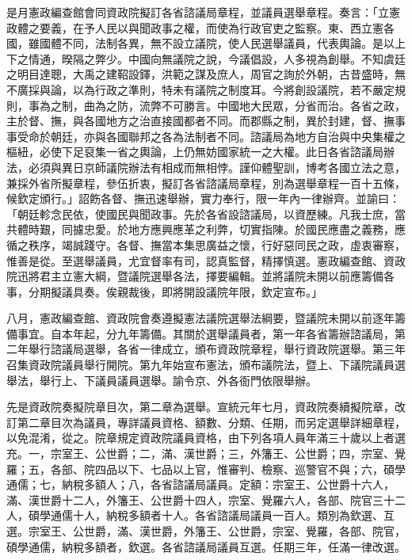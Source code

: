 \begin{pinyinscope}
是月憲政編查館會同資政院擬訂各省諮議局章程，並議員選舉章程。奏言：「立憲政體之要義，在予人民以與聞政事之權，而使為行政官吏之監察。東、西立憲各國，雖國體不同，法制各異，無不設立議院，使人民選舉議員，代表輿論。是以上下之情通，暌隔之弊少。中國向無議院之說，今議倡設，人多視為創舉。不知虞廷之明目達聰，大禹之建鞀設鐸，洪範之謀及庶人，周官之詢於外朝，古昔盛時，無不廣採與論，以為行政之準則，特未有議院之制度耳。今將創設議院，若不嚴定規則，事為之制，曲為之防，流弊不可勝言。中國地大民眾，分省而治。各省之政，主於督、撫，與各國地方之治直接國都者不同。而郡縣之制，異於封建，督、撫事事受命於朝廷，亦與各國聯邦之各為法制者不同。諮議局為地方自治與中央集權之樞紐，必使下足裒集一省之輿論，上仍無妨國家統一之大權。此日各省諮議局辦法，必須與異日京師議院辦法有相成而無相悖。謹仰體聖訓，博考各國立法之意，兼採外省所擬章程，參伍折衷，擬訂各省諮議局章程，別為選舉章程一百十五條，候欽定頒行。」詔飭各督、撫迅速舉辦，實力奉行，限一年內一律辦齊。並諭曰：「朝廷軫念民依，使國民與聞政事。先於各省設諮議局，以資歷練。凡我士庶，當共體時艱，同攄忠愛。於地方應興應革之利弊，切實指陳。於國民應盡之義務，應循之秩序，竭誠踐守。各督、撫當本集思廣益之懷，行好惡同民之政，虛衷審察，惟善是從。至選舉議員，尤宜督率有司，認真監督，精擇慎選。憲政編查館、資政院迅將君主立憲大綱，暨議院選舉各法，擇要編輯。並將議院未開以前應籌備各事，分期擬議具奏。俟親裁後，即將開設議院年限，欽定宣布。」

八月，憲政編查館、資政院會奏遵擬憲法議院選舉法綱要，暨議院未開以前逐年籌備事宜。自本年起，分九年籌備。其關於選舉議員者，第一年各省籌辦諮議局，第二年舉行諮議局選舉，各省一律成立，頒布資政院章程，舉行資政院選舉。第三年召集資政院議員舉行開院。第九年始宣布憲法，頒布議院法，暨上、下議院議員選舉法，舉行上、下議員議員選舉。諭令京、外各衙門依限舉辦。

先是資政院奏擬院章目次，第二章為選舉。宣統元年七月，資政院奏續擬院章，改訂第二章目次為議員，專詳議員資格、額數、分類、任期，而另定選舉詳細章程，以免混淆，從之。院章規定資政院議員資格，由下列各項人員年滿三十歲以上者選充。一，宗室王、公世爵；二，滿、漢世爵；三，外籓王、公世爵；四，宗室、覺羅；五，各部、院四品以下、七品以上官，惟審判、檢察、巡警官不與；六，碩學通儒；七，納稅多額人；八，各省諮議局議員。定額：宗室王、公世爵十六人，滿、漢世爵十二人，外籓王、公世爵十四人，宗室、覺羅六人，各部、院官三十二人，碩學通儒十人，納稅多額者十人。各省諮議局議員一百人。類別為欽選、互選。宗室王、公世爵，滿、漢世爵，外籓王、公世爵，宗室、覺羅，各部、院官，碩學通儒，納稅多額者，欽選。各省諮議局議員互選。任期三年，任滿一律改選。


\end{pinyinscope}
